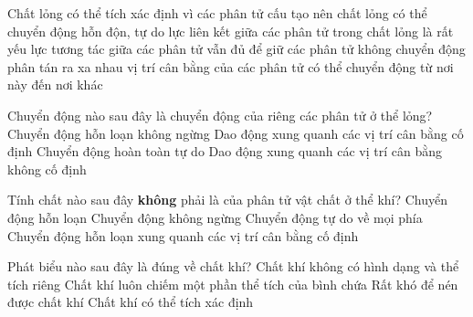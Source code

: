 \begin{ex}%
	Chất lỏng có thể tích xác định vì
	\choice
	{các phân tử cấu tạo nên chất lỏng có thể chuyển động hỗn độn, tự do}
	{lực liên kết giữa các phân tử trong chất lỏng là rất yếu}
	{\True lực tương tác giữa các phân tử vẫn đủ để giữ các phân tử không chuyển động phân tán ra xa nhau}
	{vị trí cân bằng của các phân tử có thể chuyển động từ nơi này đến nơi khác}
\end{ex}

\begin{ex}%
	Chuyển động nào sau đây là chuyển động của riêng các phân tử ở thể lỏng?
	\choice
	{Chuyển động hỗn loạn không ngừng}
	{Dao động xung quanh các vị trí cân bằng cố định}
	{Chuyển động hoàn toàn tự do}
	{\True Dao động xung quanh các vị trí cân bằng không cố định}
\end{ex}







\begin{ex}%
	Tính chất nào sau đây \textbf{không} phải là của phân tử vật chất ở thể khí?
	\choice
	{Chuyển động hỗn loạn}
	{Chuyển động không ngừng}
	{Chuyển động tự do về mọi phía}
	{\True Chuyển động hỗn loạn xung quanh các vị trí cân bằng cố định}
	\end{ex}



\begin{ex}%
	Phát biểu nào sau đây là đúng về chất khí?
	\choice
	{\True Chất khí không có hình dạng và thể tích riêng}
	{Chất khí luôn chiếm một phần thể tích của bình chứa}
	{Rất khó để nén được chất khí}
	{Chất khí có thể tích xác định}
	\end{ex}




